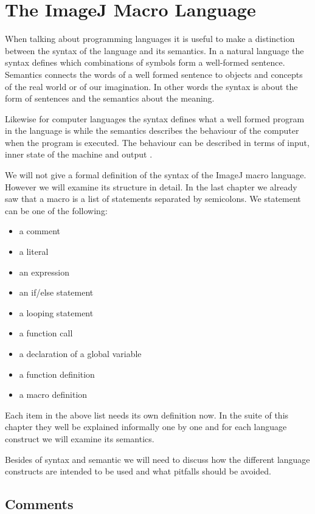 \chapter{The ImageJ Macro Language}

When talking about programming languages it is useful to make a distinction between the syntax of the language and its semantics. In a natural language the syntax defines which combinations of symbols form a well-formed sentence. Semantics connects the words of a well formed sentence to objects and concepts of the real world or of our imagination. In other words the syntax is about the form of sentences and the semantics about the meaning.  

Likewise for computer languages the syntax defines what a well formed program in the language is while the semantics describes the behaviour of the computer when the program is executed. The behaviour can be described in terms of input, inner state of the machine and output \cite{slonneger_formal_1995}. 

We will not give a formal definition of the syntax of the ImageJ macro language. However we will examine its structure in detail. In the last chapter we already saw that a macro is a list of statements separated by semicolons. We statement can be one of the following:

\begin{itemize}
\item a comment
\item a literal
\item an expression
\item an if/else statement
\item a looping statement
\item a function call
\item a declaration of a global variable
\item a function definition
\item a macro definition
\end{itemize}

Each item in the above list needs its own definition now. In the suite of this chapter they well be explained informally one by one and for each language construct we will examine its semantics. 

Besides of syntax and semantic we will need to discuss how the different language constructs are intended to be used and what pitfalls should be avoided.

\section{Comments}

